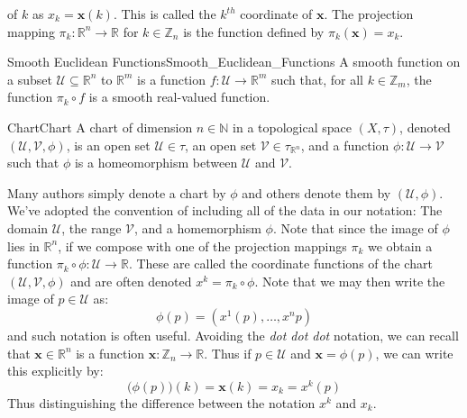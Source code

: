     of $k$ as $x_{k}=\mathbf{x}(k)$. This is called the $k^{th}$ coordinate
    of $\mathbf{x}$. The projection mapping
    $\pi_{k}:\mathbb{R}^{n}\rightarrow\mathbb{R}$ for $k\in\mathbb{Z}_{n}$ is
    the function defined by $\pi_{k}(\mathbf{x})=x_{k}$.
    \begin{ldefinition}{Smooth Euclidean Functions}{Smooth_Euclidean_Functions}
        A smooth function on a subset $\mathcal{U}\subseteq\mathbb{R}^{n}$
        to $\mathbb{R}^{m}$ is a function
        $f:\mathcal{U}\rightarrow\mathbb{R}^{m}$ such that, for all
        $k\in\mathbb{Z}_{m}$, the function $\pi_{k}\circ{f}$ is a smooth
        real-valued function.
    \end{ldefinition}
    \begin{fdefinition}{Chart}{Chart}
        A chart of dimension $n\in\mathbb{N}$ in a topological space
        $(X,\tau)$, denoted $(\mathcal{U},\mathcal{V},\phi)$, is an open set
        $\mathcal{U}\in\tau$, an open set $\mathcal{V}\in\tau_{\mathbb{R}^{n}}$,
        and a function $\phi:\mathcal{U}\rightarrow\mathcal{V}$ such that $\phi$
        is a homeomorphism between $\mathcal{U}$ and $\mathcal{V}$.
    \end{fdefinition}
    Many authors simply denote a chart by $\phi$ and others denote them
    by $(\mathcal{U},\phi)$. We've adopted the convention of including all of
    the data in our notation: The domain $\mathcal{U}$, the range $\mathcal{V}$,
    and a homemorphism $\phi$. Note that since the image of $\phi$ lies in
    $\mathbb{R}^{n}$, if we compose with one of the projection mappings
    $\pi_{k}$ we obtain a function
    $\pi_{k}\circ\phi:\mathcal{U}\rightarrow\mathbb{R}$. These are called the
    coordinate functions of the chart $(\mathcal{U},\mathcal{V},\phi)$ and are
    often denoted $x^{k}=\pi_{k}\circ\phi$. Note that we may then write the
    image of $p\in\mathcal{U}$ as:
    \begin{equation}
        \phi(p)=(x^{1}(p),\dots,x^{n}{p})
    \end{equation}
    and such notation is often useful. Avoiding the \textit{dot dot dot}
    notation, we can recall that $\mathbf{x}\in\mathbb{R}^{n}$ is a function
    $\mathbf{x}:\mathbb{Z}_{n}\rightarrow\mathbb{R}$. Thus if $p\in\mathcal{U}$
    and $\mathbf{x}=\phi(p)$, we can write this explicitly by:
    \begin{equation}
        \big(\phi(p)\big)(k)=\mathbf{x}(k)=x_{k}=x^{k}(p)
    \end{equation}
    Thus distinguishing the difference between the notation $x^{k}$ and $x_{k}$.

